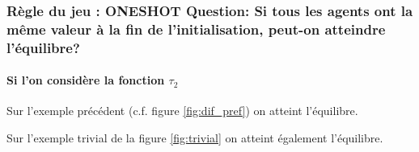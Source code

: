 \documentclass[12pt]{article}
\theoremstyle{defi}
\theoremstyle{not}
\theoremstyle{prob}
\begin{document}
      \subsubsection{Règle du jeu : ONESHOT Question: Si tous les agents ont la même valeur à la fin de l'initialisation, peut-on atteindre l'équilibre?}

        \paragraph{Si l'on considère la fonction $\tau_2$\\}

          Sur l'exemple précédent (c.f. figure \ref{fig:dif_pref}) on atteint l'équilibre.

          Sur l'exemple trivial de la figure \ref{fig:trivial} on atteint également l'équilibre.
\end{document}
